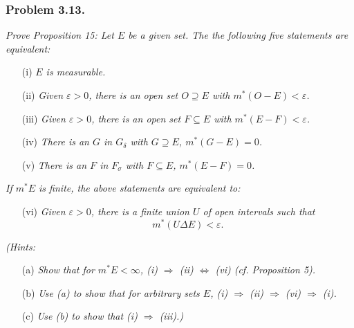 \documentclass{article}
\begin{document}
\subsubsection*{Problem 3.13.}
\emph{Prove Proposition 15: Let $E$ be a given set.
The the following five statements are equivalent:}
\begin{enumerate}
\item[(i)]
  \emph{$E$ is measurable.}

\item[(ii)]
  \emph{Given $\varepsilon > 0$, there is an open set $O \supseteq E$ with
  $m^{*}(O - E) < \varepsilon$.}

\item[(iii)]
  \emph{Given $\varepsilon > 0$, there is an open set $F \subseteq E$ with
  $m^{*}(E - F) < \varepsilon$.}

\item[(iv)]
  \emph{There is an $G$ in $G_{\delta}$ with $G \supseteq E$, $m^{*}(G - E) = 0$.}

\item[(v)]
  \emph{There is an $F$ in $F_{\sigma}$ with $F \subseteq E$, $m^{*}(E - F) = 0$.}
\end{enumerate}
\emph{If $m^{*}E$ is finite, the above statements are equivalent to:}
\begin{enumerate}
\item[(vi)]
  \emph{Given $\varepsilon > 0$, there is a finite union $U$ of open intervals
  such that}
  \[
    m^{*}(U \Delta E) < \varepsilon.
  \]
\end{enumerate}
\emph{(Hints:}
\begin{enumerate}
\item[(a)]
  \emph{Show that for $m^{*}E < \infty$,
  (i) $\Rightarrow$ (ii) $\Leftrightarrow$ (vi) (cf. Proposition 5).}

\item[(b)]
  \emph{Use (a) to show that for arbitrary sets $E$,
  (i) $\Rightarrow$ (ii) $\Rightarrow$ (vi) $\Rightarrow$ (i).}

\item[(c)]
  \emph{Use (b) to show that (i) $\Rightarrow$ (iii).)} \\
\end{enumerate}
\end{document}
